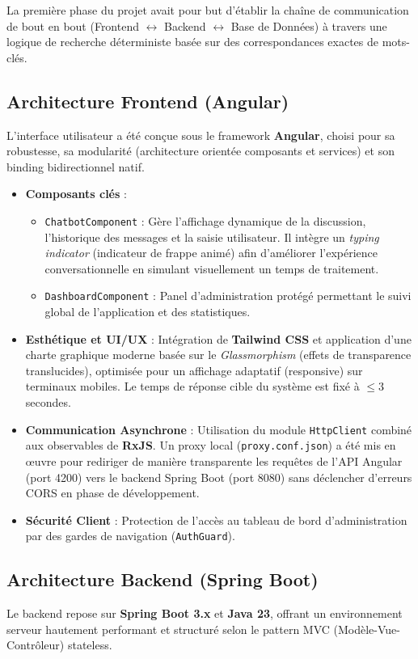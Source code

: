 \documentclass[11pt,a4paper]{article}
\begin{document}
La première phase du projet avait pour but d'établir la chaîne de communication de bout en bout (Frontend $\leftrightarrow$ Backend $\leftrightarrow$ Base de Données) à travers une logique de recherche déterministe basée sur des correspondances exactes de mots-clés.

\subsection{Architecture Frontend (Angular)}
L'interface utilisateur a été conçue sous le framework \textbf{Angular}, choisi pour sa robustesse, sa modularité (architecture orientée composants et services) et son binding bidirectionnel natif.

\begin{itemize}
    \item \textbf{Composants clés} :
    \begin{itemize}
        \item \texttt{ChatbotComponent} : Gère l'affichage dynamique de la discussion, l'historique des messages et la saisie utilisateur. Il intègre un \textit{typing indicator} (indicateur de frappe animé) afin d'améliorer l'expérience conversationnelle en simulant visuellement un temps de traitement.
        \item \texttt{DashboardComponent} : Panel d'administration protégé permettant le suivi global de l'application et des statistiques.
    \end{itemize}
    \item \textbf{Esthétique et UI/UX} : Intégration de \textbf{Tailwind CSS} et application d'une charte graphique moderne basée sur le \textit{Glassmorphism} (effets de transparence translucides), optimisée pour un affichage adaptatif (responsive) sur terminaux mobiles. Le temps de réponse cible du système est fixé à $\le 3$ secondes.
    \item \textbf{Communication Asynchrone} : Utilisation du module \texttt{HttpClient} combiné aux observables de \textbf{RxJS}. Un proxy local (\texttt{proxy.conf.json}) a été mis en œuvre pour rediriger de manière transparente les requêtes de l'API Angular (port 4200) vers le backend Spring Boot (port 8080) sans déclencher d'erreurs CORS en phase de développement.
    \item \textbf{Sécurité Client} : Protection de l'accès au tableau de bord d'administration par des gardes de navigation (\texttt{AuthGuard}).
\end{itemize}

\subsection{Architecture Backend (Spring Boot)}
Le backend repose sur \textbf{Spring Boot 3.x} et \textbf{Java 23}, offrant un environnement serveur hautement performant et structuré selon le pattern MVC (Modèle-Vue-Contrôleur) stateless.
\end{document}
